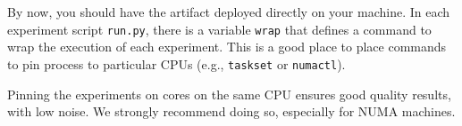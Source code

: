 \documentclass[12pt]{article}
\begin{document}
By now, you should have the artifact deployed directly on your machine.  In each
experiment script \texttt{run.py}, there is a variable \texttt{wrap} that
defines a command to wrap the execution of each experiment.  This is a good
place to place commands to pin process to particular CPUs (e.g.,
\texttt{taskset} or \texttt{numactl}).

Pinning the experiments on cores on the same CPU ensures good quality results,
with low noise.  We strongly recommend doing so, especially for NUMA machines.
\end{document}

